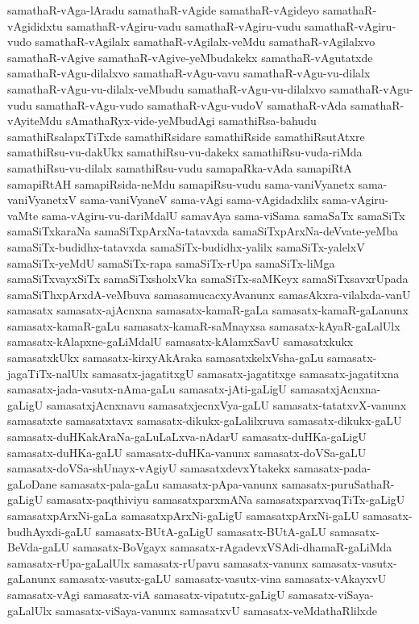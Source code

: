 {samathaR-vAga-lAradu
samathaR-vAgide
samathaR-vAgideyo
samathaR-vAgididxtu
samathaR-vAgiru-vadu
samathaR-vAgiru-vudu
samathaR-vAgiru-vudo
samathaR-vAgilalx
samathaR-vAgilalx-veMdu
samathaR-vAgilalxvo
samathaR-vAgive
samathaR-vAgive-yeMbudakekx
samathaR-vAgutatxde
samathaR-vAgu-dilalxvo
samathaR-vAgu-vavu
samathaR-vAgu-vu-dilalx
samathaR-vAgu-vu-dilalx-veMbudu
samathaR-vAgu-vu-dilalxvo
samathaR-vAgu-vudu
samathaR-vAgu-vudo
samathaR-vAgu-vudoV
samathaR-vAda
samathaR-vAyiteMdu
sAmathaRyx-vide-yeMbudAgi
samathiRsa-bahudu
samathiRsalapxTiTxde
samathiRsidare
samathiRside
samathiRsutAtxre
samathiRsu-vu-dakUkx
samathiRsu-vu-dakekx
samathiRsu-vuda-riMda
samathiRsu-vu-dilalx
samathiRsu-vudu
samapaRka-vAda
samapiRtA
samapiRtAH
samapiRsida-neMdu
samapiRsu-vudu
sama-vaniVyanetx
sama-vaniVyanetxV
sama-vaniVyaneV
sama-vAgi
sama-vAgidadxlilx
sama-vAgiru-vaMte
sama-vAgiru-vu-dariMdalU
samavAya
sama-viSama
samaSaTx
samaSiTx
samaSiTxkaraNa
samaSiTxpArxNa-tatavxda
samaSiTxpArxNa-deVvate-yeMba
samaSiTx-budidhx-tatavxda
samaSiTx-budidhx-yalilx
samaSiTx-yalelxV
samaSiTx-yeMdU
samaSiTx-rapa
samaSiTx-rUpa
samaSiTx-liMga
samaSiTxvayxSiTx
samaSiTxsholxVka
samaSiTx-saMKeyx
samaSiTxsavxrUpada
samaSiThxpArxdA-veMbuva
samasamucacxyAvanunx
samasAkxra-vilalxda-vanU
samasatx
samasatx-ajAcnxna
samasatx-kamaR-gaLa
samasatx-kamaR-gaLanunx
samasatx-kamaR-gaLu
samasatx-kamaR-saMnayxsa
samasatx-kAyaR-gaLalUlx
samasatx-kAlapxne-gaLiMdalU
samasatx-kAlamxSavU
samasatxkukx
samasatxkUkx
samasatx-kirxyAkAraka
samasatxkelxVsha-gaLu
samasatx-jagaTiTx-nalUlx
samasatx-jagatitxgU
samasatx-jagatitxge
samasatx-jagatitxna
samasatx-jada-vasutx-nAma-gaLu
samasatx-jAti-gaLigU
samasatxjAcnxna-gaLigU
samasatxjAcnxnavu
samasatxjecnxVya-gaLU
samasatx-tatatxvX-vanunx
samasatxte
samasatxtavx
samasatx-dikukx-gaLalilxruva
samasatx-dikukx-gaLU
samasatx-duHKakAraNa-gaLuLaLxva-nAdarU
samasatx-duHKa-gaLigU
samasatx-duHKa-gaLU
samasatx-duHKa-vanunx
samasatx-doVSa-gaLU
samasatx-doVSa-shUnayx-vAgiyU
samasatxdevxYtakekx
samasatx-pada-gaLoDane
samasatx-pala-gaLu
samasatx-pApa-vanunx
samasatx-puruSathaR-gaLigU
samasatx-paqthiviyu
samasatxparxmANa
samasatxparxvaqTiTx-gaLigU
samasatxpArxNi-gaLa
samasatxpArxNi-gaLigU
samasatxpArxNi-gaLU
samasatx-budhAyxdi-gaLU
samasatx-BUtA-gaLigU
samasatx-BUtA-gaLU
samasatx-BeVda-gaLU
samasatx-BoVgayx
samasatx-rAgadevxVSAdi-dhamaR-gaLiMda
samasatx-rUpa-gaLalUlx
samasatx-rUpavu
samasatx-vanunx
samasatx-vasutx-gaLanunx
samasatx-vasutx-gaLU
samasatx-vasutx-vina
samasatx-vAkayxvU
samasatx-vAgi
samasatx-viA
samasatx-vipatutx-gaLigU
samasatx-viSaya-gaLalUlx
samasatx-viSaya-vanunx
samasatxvU
samasatx-veMdathaRlilxde
}
